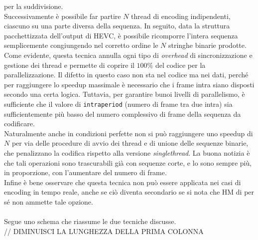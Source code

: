 per la suddivisione.\\
Successivamente è possibile far partire $N$ thread di encoding 
indipendenti, ciascuno su una parte diversa della sequenza. In seguito, data la 
struttura 
pacchettizzata dell'output di HEVC, è possibile ricomporre l'intera 
sequenza semplicemente congiungendo nel corretto ordine le $N$ stringhe binarie 
prodotte. \\
Come evidente, questa tecnica annulla ogni tipo di \emph{overhead} di 
sincronizzazione e gestione dei thread e permette di coprire il $100\%$ del 
codice per la parallelizzazione. Il difetto in questo caso non sta nel codice 
ma nei dati, perché per raggiungere lo speedup massimale è necessario che i 
frame intra siano disposti secondo una certa logica. Tuttavia, per garantire 
bunoi livelli di parallelismo, è sufficiente che il valore di 
\verb|intraperiod| (numero di frame tra due intra) sia sufficientemente più 
basso del numero complessivo di frame della sequenza da codificare. \\
Naturalmente anche in condizioni perfette non si può raggiungere uno speedup di 
$N$ per via delle procedure di avvio dei thread e di
unione delle sequenze binarie, che penalizzano la codifica 
rispetto alla versione \emph{singlethread}. La buona 
notizia è che tali operazioni sono trascurabili già con sequenze corte, e lo 
sono sempre più, in proporzione, con l'aumentare del numero di frame.\\
Infine è bene osservare che questa tecnica non può essere applicata 
nei casi di encoding in tempo reale, anche se ciò diventa secondario se si nota 
che HM di per sé non ammette tale opzione.
\\ \\
Segue uno schema che riassume le due tecniche discusse.
\\ // DIMINUISCI LA LUNGHEZZA DELLA PRIMA COLONNA
